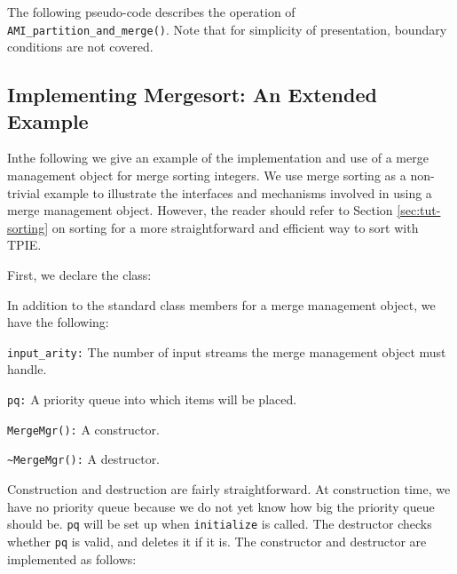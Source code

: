 The following pseudo-code describes the operation of
\lstinline|AMI_partition_and_merge()|.  Note that for simplicity of
presentation, boundary conditions are not covered.



\subsection{Implementing Mergesort: An Extended Example}

Inthe following we give
an example of the implementation and use of a merge management object
for merge sorting integers.  We use merge sorting as a non-trivial
example to illustrate the interfaces and mechanisms involved in using
a merge management object. However, the reader should refer to Section
\ref{sec:tut-sorting} on sorting for a more straightforward and
efficient way to sort with TPIE.

First, we declare the class:



In addition to the standard class members for a merge management
object, we have the following:

\begin{description}
    \item\lstinline|input_arity:| The number of input streams
    the merge management object must handle.
    \item\lstinline|pq:| A priority queue into which items
    will be placed.
    \item\lstinline|MergeMgr():| A constructor.
    \item\lstinline|~MergeMgr():| A destructor.
\end{description}

Construction and destruction are fairly straightforward.  At
construction time, we have no priority queue because we do not yet
know how big the priority queue should be.  \lstinline|pq| will be set
up when \lstinline|initialize| is called.  The destructor checks
whether \lstinline|pq| is valid, and deletes it if it is.  The
constructor and destructor are implemented as follows:



